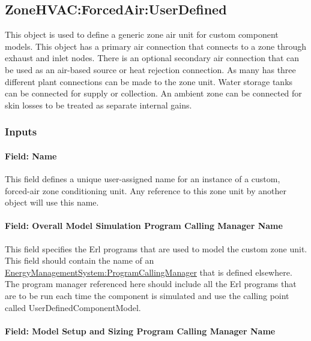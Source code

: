 \subsection{ZoneHVAC:ForcedAir:UserDefined}\label{zonehvacforcedairuserdefined}

This object is used to define a generic zone air unit for custom component models. This object has a primary air connection that connects to a zone through exhaust and inlet nodes. There is an optional secondary air connection that can be used as an air-based source or heat rejection connection. As many has three different plant connections can be made to the zone unit. Water storage tanks can be connected for supply or collection. An ambient zone can be connected for skin losses to be treated as separate internal gains.

\subsubsection{Inputs}\label{inputs-050}

\paragraph{Field: Name}\label{field-name-049}

This field defines a unique user-assigned name for an instance of a custom, forced-air zone conditioning unit. Any reference to this zone unit by another object will use this name.

\paragraph{Field: Overall Model Simulation Program Calling Manager Name}\label{field-overall-model-simulation-program-calling-manager-name}

This field specifies the Erl programs that are used to model the custom zone unit. This field should contain the name of an \hyperref[energymanagementsystemprogramcallingmanager]{EnergyManagementSystem:ProgramCallingManager} that is defined elsewhere. The program manager referenced here should include all the Erl programs that are to be run each time the component is simulated and use the calling point called UserDefinedComponentModel.

\paragraph{Field: Model Setup and Sizing Program Calling Manager Name}\label{field-model-setup-and-sizing-program-calling-manager-name}

